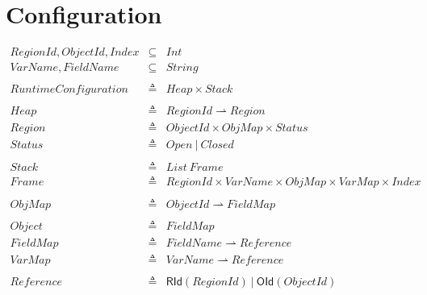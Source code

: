 \documentclass[acmsmall,nonacm,screen]{acmart}
\begin{document}
\appendix
\section{Configuration}
{\setlength{\arraycolsep}{2pt}
\[
\begin{array}{rcl}
  RegionId, ObjectId, Index & \subseteq & Int \\
  VarName, FieldName & \subseteq & String \\
  &&\\
  RuntimeConfiguration & \triangleq & Heap \times Stack\\
  &&\\
  Heap & \triangleq & RegionId \rightharpoonup Region\\
  Region & \triangleq & ObjectId\times ObjMap \times Status\\
  Status & \triangleq & Open \ | \ Closed\\
  &&\\
  Stack & \triangleq & List \ Frame\\
  Frame & \triangleq & RegionId \times VarName \times ObjMap \times VarMap \times Index\\
  &&\\
  ObjMap & \triangleq & ObjectId \rightharpoonup FieldMap\\
  &&\\
  Object & \triangleq & FieldMap\\
  FieldMap & \triangleq & FieldName \rightharpoonup Reference\\
  VarMap & \triangleq & VarName \rightharpoonup Reference\\
  &&\\
  Reference & \triangleq & \mathsf{RId}(RegionId) \ | \ \mathsf{OId}(ObjectId)
\end{array}
\]}
\end{document}
